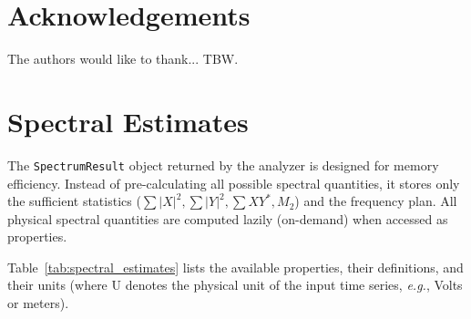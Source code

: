 \documentclass[final, 5p, times, twocolumn, number, sort&compress]{elsarticle}
\newcommand{\eg}{\textit{e.g.}}
\begin{document}
\section*{Acknowledgements}

The authors would like to thank... TBW.



\appendix
\section{Spectral Estimates}
\label{sec:params}

The \texttt{SpectrumResult} object returned by the analyzer is designed for memory efficiency. Instead of pre-calculating all possible spectral quantities, it stores only the sufficient statistics ($\sum |X|^2, \sum |Y|^2, \sum XY^*, M_2$) and the frequency plan. All physical spectral quantities are computed lazily (on-demand) when accessed as properties.

Table~\ref{tab:spectral_estimates} lists the available properties, their definitions, and their units (where U denotes the physical unit of the input time series, \eg, Volts or meters).
\end{document}
